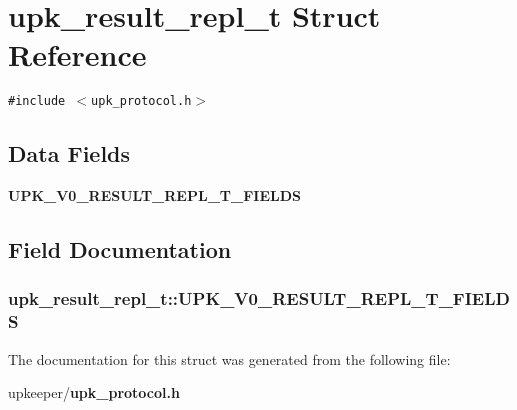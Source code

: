 \section{upk\_\-result\_\-repl\_\-t Struct Reference}
\label{structupk__result__repl__t}
{\tt \#include $<$upk\_\-protocol.h$>$}

\subsection*{Data Fields}
\begin{CompactItemize}
\item 
\bf{UPK\_\-V0\_\-RESULT\_\-REPL\_\-T\_\-FIELDS}
\end{CompactItemize}


\subsection{Field Documentation}
\subsubsection{\setlength{\rightskip}{0pt plus 5cm}\bf{upk\_\-result\_\-repl\_\-t::UPK\_\-V0\_\-RESULT\_\-REPL\_\-T\_\-FIELDS}}\label{structupk__result__repl__t_f53b55452388995af066f509094abc44}




The documentation for this struct was generated from the following file:\begin{CompactItemize}
\item 
upkeeper/\bf{upk\_\-protocol.h}\end{CompactItemize}
